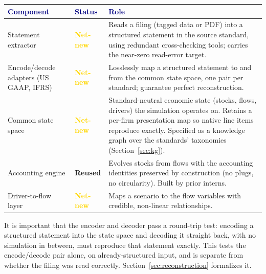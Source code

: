 \documentclass[11pt]{article}
\newcommand{\headtext}[1]{\textcolor{navy}{\textbf{#1}}}
\begin{document}
\vspace{6pt}
\noindent\begin{minipage}{\linewidth}
\renewcommand{\arraystretch}{1.12}
\begin{tabularx}{\linewidth}{>{\raggedright\arraybackslash}p{3.1cm} >{\raggedright\arraybackslash}p{1.9cm} X}
\hline
\rowcolor{tblhead} \headtext{Component} & \headtext{Status} & \headtext{Role} \\ \hline
Statement extractor & \textbf{\textcolor{gold}{Net-new}} & Reads a filing (tagged data or PDF) into a structured statement in the source standard, using redundant cross-checking tools; carries the near-zero read-error target. \\ \hline
Encode/decode adapters (US GAAP, IFRS) & \textbf{\textcolor{gold}{Net-new}} & Losslessly map a structured statement to and from the common state space, one pair per standard; guarantee perfect reconstruction. \\ \hline
Common state space & \textbf{\textcolor{gold}{Net-new}} & Standard-neutral economic state (stocks, flows, drivers) the simulation operates on. Retains a per-firm presentation map so native line items reproduce exactly. Specified as a knowledge graph over the standards' taxonomies (Section~\ref{sec:kg}). \\ \hline
Accounting engine & \textbf{\textcolor{fgreen}{Reused}} & Evolves stocks from flows with the accounting identities preserved by construction (no plugs, no circularity). Built by prior interns. \\ \hline
Driver-to-flow layer & \textbf{\textcolor{gold}{Net-new}} & Maps a scenario to the flow variables with credible, non-linear relationships. \\ \hline
\end{tabularx}
\label{tab:components}
\end{minipage}

It is important that the encoder and decoder pass a round-trip test: encoding a structured statement into the state space and decoding it straight back, with no simulation in between, must reproduce that statement exactly. This tests the encode/decode pair alone, on already-structured input, and is separate from whether the filing was read correctly. Section~\ref{sec:reconstruction} formalizes it.
\end{document}
